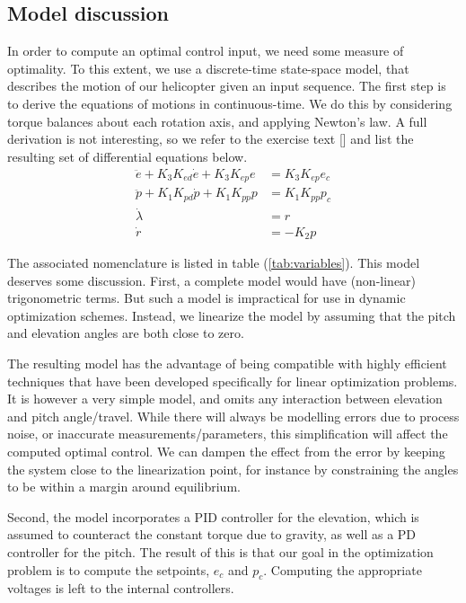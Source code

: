 \subsection{Model discussion}
In order to compute an optimal control input, we need some measure of optimality.
To this extent, we use a discrete-time state-space model, that describes the motion
of our helicopter given an input sequence. The first step is to derive the equations
of motions in continuous-time. We do this by considering torque balances about each
rotation axis, and applying Newton's law. A full derivation is not interesting, so
we refer to the exercise text [\cite{LabExercise}] and list the resulting set of
differential equations below.
\begin{subequations}
\label{eq:model_al}
\begin{align}
    \ddot{e} + K_{3} K_{ed} \dot{e} + K_{3} K_{ep} e &= K_{3} K_{ep} e_{c} \label{eq:model_se_al_elev} \\
    \ddot{p} + K_{1} K_{pd} \dot{p} + K_{1} K_{pp} p &= K_{1} K_{pp} p_{c} \label{eq:model_se_al_pitch} \\
    \dot{\lambda} &= r \label{eq:model_se_al_lambda} \\
    \dot{r} &= -K_{2} p \label{eq:model_se_al_r}
\end{align}
\end{subequations}

The associated nomenclature is listed in table (\ref{tab:variables}). This model deserves some discussion. First, a complete model would have (non-linear) trigonometric terms. But such a model is impractical for use in dynamic optimization schemes. Instead, we linearize the model by assuming that the pitch and elevation angles are both close to zero.

The resulting model has the advantage of being compatible with highly efficient techniques that have been developed specifically for linear optimization problems. It is however a very simple model, and omits any interaction between elevation and pitch angle/travel. While there will always be modelling errors due to process noise, or inaccurate measurements/parameters, this simplification will affect the computed optimal control. We can dampen the effect from the error by keeping the system close to the linearization point, for instance by constraining the angles to be within a margin around equilibrium.

Second, the model incorporates a PID controller for the elevation, which is assumed to counteract the constant torque due to gravity, as well as a PD controller for the pitch. The result of this is that our goal in the optimization problem is to compute the setpoints, $e_c$ and $p_c$. Computing the appropriate voltages is left to the internal controllers.

